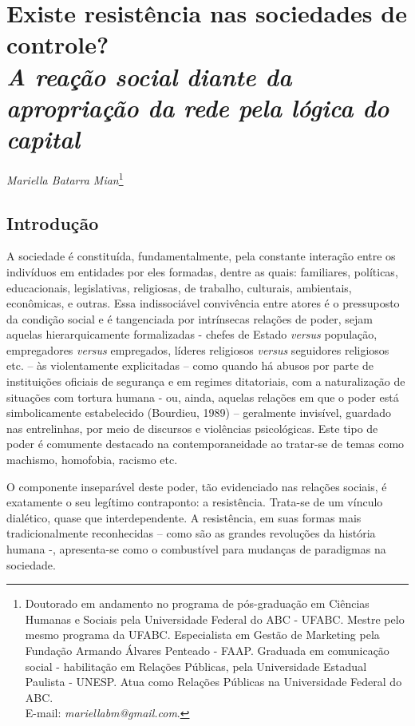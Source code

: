 \chapter*{Existe resistência nas sociedades de controle?\\ \emph{\small{A reação social diante da apropriação da rede pela lógica do capital}}}


\begin{flushright}
\emph{Mariella Batarra Mian}\footnote{Doutorado em andamento no programa de
  pós-graduação em Ciências Humanas e Sociais pela Universidade Federal
  do ABC - UFABC. Mestre pelo mesmo programa da UFABC. Especialista em
  Gestão de Marketing pela Fundação Armando Álvares Penteado - FAAP.
  Graduada em comunicação social - habilitação em Relações Públicas,
  pela Universidade Estadual Paulista - UNESP. Atua como Relações
  Públicas na Universidade Federal do ABC.\\
  E-mail: \emph{mariellabm@gmail.com}.}
\end{flushright}

\section{Introdução}

A sociedade é constituída, fundamentalmente, pela constante interação
entre os indivíduos em entidades por eles formadas, dentre as quais:
familiares, políticas, educacionais, legislativas, religiosas, de
trabalho, culturais, ambientais, econômicas, e outras. Essa
indissociável convivência entre atores é o pressuposto da condição
social e é tangenciada por intrínsecas relações de poder, sejam aquelas
hierarquicamente formalizadas - chefes de Estado \emph{versus}
população, empregadores \emph{versus} empregados, líderes religiosos
\emph{versus} seguidores religiosos etc. -- às violentamente
explicitadas -- como quando há abusos por parte de instituições oficiais
de segurança e em regimes ditatoriais, com a naturalização de situações
com tortura humana - ou, ainda, aquelas relações em que o poder está
simbolicamente estabelecido (Bourdieu, 1989) -- geralmente invisível,
guardado nas entrelinhas, por meio de discursos e violências
psicológicas. Este tipo de poder é comumente destacado na
contemporaneidade ao tratar-se de temas como machismo, homofobia,
racismo etc.

O componente inseparável deste poder, tão evidenciado nas relações
sociais, é exatamente o seu legítimo contraponto: a resistência.
Trata-se de um vínculo dialético, quase que interdependente. A
resistência, em suas formas mais tradicionalmente reconhecidas -- como
são as grandes revoluções da história humana -, apresenta-se como o
combustível para mudanças de paradigmas na sociedade.

